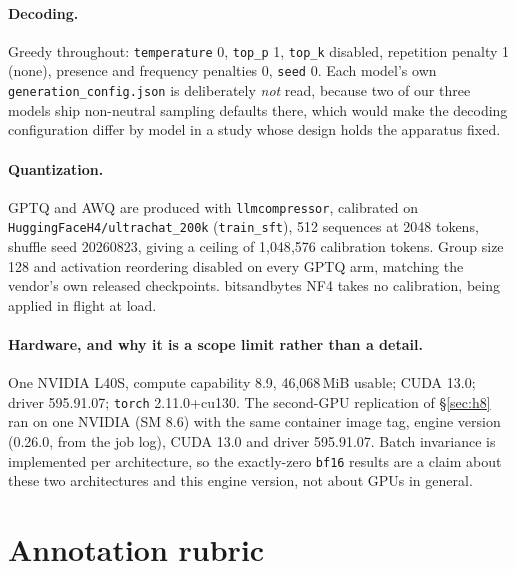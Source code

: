 \documentclass[11pt]{article}
\begin{document}
\paragraph{Decoding.} Greedy throughout: \texttt{temperature} 0, \texttt{top\_p} 1,
\texttt{top\_k} disabled, repetition penalty 1 (none), presence and frequency penalties 0,
\texttt{seed} 0. Each
model's own \texttt{generation\_config.json} is deliberately \emph{not} read, because two
of our three models ship non-neutral sampling defaults there, which would make the
decoding configuration differ by model in a study whose design holds the apparatus fixed.

\paragraph{Quantization.} GPTQ and AWQ are produced with
\texttt{llmcompressor}, calibrated on \texttt{HuggingFaceH4/ultrachat\_200k}
(\texttt{train\_sft}), 512 sequences at 2048 tokens, shuffle seed 20260823, giving a
ceiling of 1{,}048{,}576 calibration tokens. Group size 128 and activation reordering
disabled on every GPTQ arm, matching the vendor's own released checkpoints. bitsandbytes
NF4 takes no calibration, being applied in flight at load.

\paragraph{Hardware, and why it is a scope limit rather than a detail.}
One NVIDIA L40S, compute capability 8.9, 46{,}068\,MiB usable; CUDA 13.0; driver
595.91.07; \texttt{torch} 2.11.0+cu130. The second-GPU replication of \S\ref{sec:h8}
ran on one NVIDIA \hEightSpotGPU{} (SM 8.6) with the same container image tag, engine
version (0.26.0, from the job log), CUDA 13.0 and driver 595.91.07. Batch invariance is implemented per architecture, so the exactly-zero
\texttt{bf16} results are a claim about these two architectures and this engine version,
not about GPUs in general.

\section{Annotation rubric}
\label{app:rubric}

%
\end{document}
